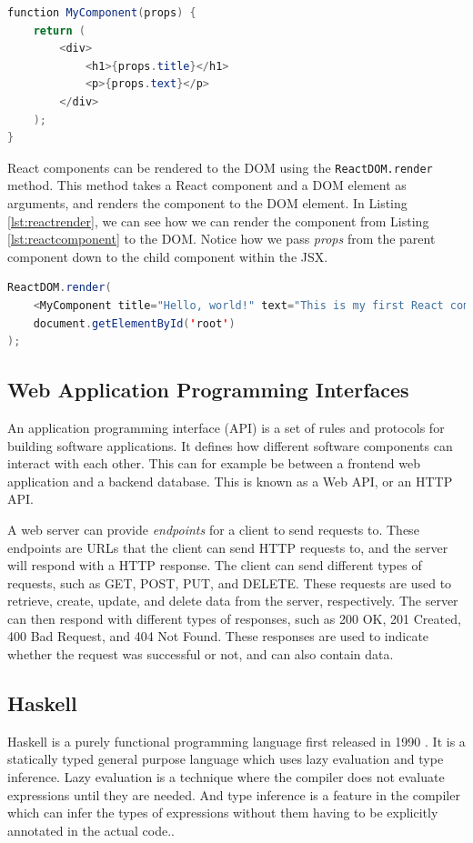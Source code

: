 \documentclass[11pt, a4paper]{article}
\begin{document}
\begin{lstlisting}[language=java, caption={A React component written using the functional approach.}, label={lst:reactcomponent}]
function MyComponent(props) {
    return (
        <div>
            <h1>{props.title}</h1>
            <p>{props.text}</p>
        </div>
    );
}
\end{lstlisting}

React components can be rendered to the DOM using the \texttt{ReactDOM.render} method. This method takes a React component and a DOM element as arguments, and renders the component to the DOM element. In Listing \ref{lst:reactrender}, we can see how we can render the component from Listing \ref{lst:reactcomponent} to the DOM. Notice how we pass \textit{props} from the parent component down to the child component within the JSX.

\begin{lstlisting}[language=java, caption={Rendering a React component to the DOM.}, label={lst:reactrender}]
ReactDOM.render(
    <MyComponent title="Hello, world!" text="This is my first React component." />,
    document.getElementById('root')
);
\end{lstlisting}

\subsection{Web Application Programming Interfaces}
\label{sec:apis}
An application programming interface (API) is a set of rules and protocols for building software applications. It defines how different software components can interact with each other. This can for example be between a frontend web application and a backend database. This is known as a Web API, or an HTTP API.

A web server can provide \textit{endpoints} for a client to send requests to. These endpoints are URLs that the client can send HTTP requests to, and the server will respond with a HTTP response. The client can send different types of requests, such as GET, POST, PUT, and DELETE. These requests are used to retrieve, create, update, and delete data from the server, respectively. The server can then respond with different types of responses, such as 200 OK, 201 Created, 400 Bad Request, and 404 Not Found. These responses are used to indicate whether the request was successful or not, and can also contain data.

\subsection{Haskell}
\label{sec:haskell}
Haskell is a purely functional programming language first released in 1990 \cite{haskell}. It is a statically typed general purpose language which uses lazy evaluation and type inference. Lazy evaluation is a technique where the compiler does not evaluate expressions until they are needed. And type inference is a feature in the compiler which can infer the types of expressions without them having to be explicitly annotated in the actual code..
\end{document}
